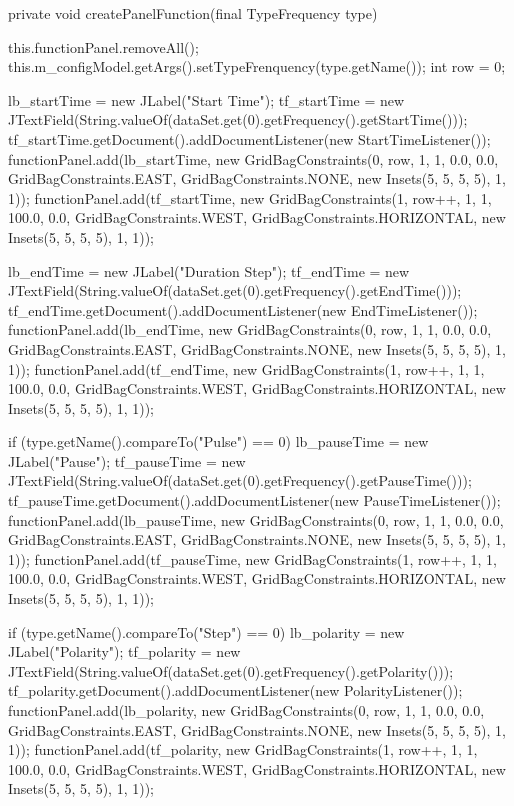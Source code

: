 \begin{codigo}[caption={Código para gerar a os parâmetros para a modulação}, label={code:panel}, breaklines=true]
	private void createPanelFunction(final TypeFrequency type) {
		
		this.functionPanel.removeAll();
		this.m_configModel.getArgs().setTypeFrenquency(type.getName());
		int row = 0;
		
		lb_startTime = new JLabel("Start Time");
		tf_startTime = new JTextField(String.valueOf(dataSet.get(0).getFrequency().getStartTime()));
		tf_startTime.getDocument().addDocumentListener(new StartTimeListener());
		functionPanel.add(lb_startTime, new GridBagConstraints(0, row, 1, 1, 0.0, 0.0, GridBagConstraints.EAST,
		GridBagConstraints.NONE, new Insets(5, 5, 5, 5), 1, 1));
		functionPanel.add(tf_startTime, new GridBagConstraints(1, row++, 1, 1, 100.0, 0.0, GridBagConstraints.WEST,
		GridBagConstraints.HORIZONTAL, new Insets(5, 5, 5, 5), 1, 1));
		
		lb_endTime = new JLabel("Duration Step");
		tf_endTime = new JTextField(String.valueOf(dataSet.get(0).getFrequency().getEndTime()));
		tf_endTime.getDocument().addDocumentListener(new EndTimeListener());
		functionPanel.add(lb_endTime, new GridBagConstraints(0, row, 1, 1, 0.0, 0.0, GridBagConstraints.EAST,
		GridBagConstraints.NONE, new Insets(5, 5, 5, 5), 1, 1));
		functionPanel.add(tf_endTime, new GridBagConstraints(1, row++, 1, 1, 100.0, 0.0, GridBagConstraints.WEST,
		GridBagConstraints.HORIZONTAL, new Insets(5, 5, 5, 5), 1, 1));
		
		if (type.getName().compareTo("Pulse") == 0) {
			lb_pauseTime = new JLabel("Pause");
			tf_pauseTime = new JTextField(String.valueOf(dataSet.get(0).getFrequency().getPauseTime()));
			tf_pauseTime.getDocument().addDocumentListener(new PauseTimeListener());
			functionPanel.add(lb_pauseTime, new GridBagConstraints(0, row, 1, 1, 0.0, 0.0, GridBagConstraints.EAST,
			GridBagConstraints.NONE, new Insets(5, 5, 5, 5), 1, 1));
			functionPanel.add(tf_pauseTime, new GridBagConstraints(1, row++, 1, 1, 100.0, 0.0, GridBagConstraints.WEST,
			GridBagConstraints.HORIZONTAL, new Insets(5, 5, 5, 5), 1, 1));
		}
		
		if (type.getName().compareTo("Step") == 0) {
			lb_polarity = new JLabel("Polarity");
			tf_polarity = new JTextField(String.valueOf(dataSet.get(0).getFrequency().getPolarity()));
			tf_polarity.getDocument().addDocumentListener(new PolarityListener());
			functionPanel.add(lb_polarity, new GridBagConstraints(0, row, 1, 1, 0.0, 0.0, GridBagConstraints.EAST,
			GridBagConstraints.NONE, new Insets(5, 5, 5, 5), 1, 1));
			functionPanel.add(tf_polarity, new GridBagConstraints(1, row++, 1, 1, 100.0, 0.0, GridBagConstraints.WEST,
			GridBagConstraints.HORIZONTAL, new Insets(5, 5, 5, 5), 1, 1));
		}
		
}
\end{codigo}
